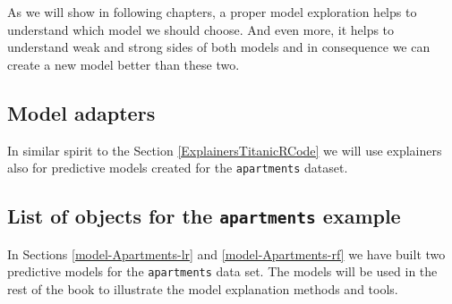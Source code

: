 \documentclass[]{krantz}
\newenvironment{Shaded}{\begin{snugshade}}{\end{snugshade}}
\newcommand{\DataTypeTok}[1]{\textcolor[rgb]{0.13,0.29,0.53}{#1}}
\newcommand{\KeywordTok}[1]{\textcolor[rgb]{0.13,0.29,0.53}{\textbf{#1}}}
\newcommand{\NormalTok}[1]{#1}
\newcommand{\OperatorTok}[1]{\textcolor[rgb]{0.81,0.36,0.00}{\textbf{#1}}}
\newcommand{\StringTok}[1]{\textcolor[rgb]{0.31,0.60,0.02}{#1}}
\begin{document}
As we will show in following chapters, a proper model exploration helps to understand which model we should choose. And even more, it helps to understand weak and strong sides of both models and in consequence we can create a new model better than these two.

\hypertarget{ExplainersApartmentsRCode}{%
\subsection{Model adapters}\label{ExplainersApartmentsRCode}}

In similar spirit to the Section \ref{ExplainersTitanicRCode} we will use explainers also for predictive models created for the \texttt{apartments} dataset.

\begin{Shaded}
\end{Shaded}

\hypertarget{ListOfModelsApartments}{%
\subsection{\texorpdfstring{List of objects for the \texttt{apartments} example}{List of objects for the apartments example}}\label{ListOfModelsApartments}}

In Sections \ref{model-Apartments-lr} and \ref{model-Apartments-rf} we have built two predictive models for the \texttt{apartments} data set. The models will be used in the rest of the book to illustrate the model explanation methods and tools.
\end{document}
